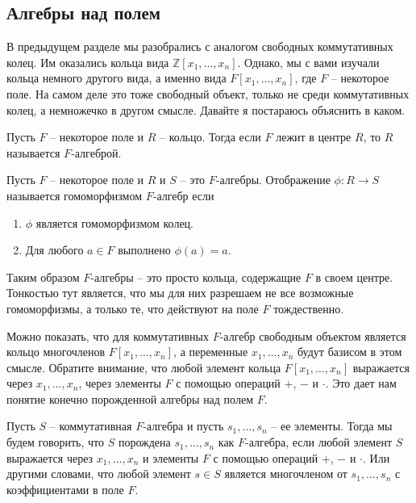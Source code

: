 \subsection{Алгебры над полем}

В предыдущем разделе мы разобрались с аналогом свободных коммутативных колец.
Им оказались кольца вида $\mathbb Z[x_1,\ldots,x_n]$.
Однако, мы с вами изучали кольца немного другого вида, а именно вида $F[x_1,\ldots,x_n]$, где $F$ -- некоторое поле.
На самом деле это тоже свободный объект, только не среди коммутативных колец, а немножечко в другом смысле.
Давайте я постараюсь объяснить в каком.

\begin{definition}
Пусть $F$ -- некоторое поле и $R$ -- кольцо.
Тогда если $F$ лежит в центре $R$, то $R$ называется $F$-алгеброй.
\end{definition}

\begin{definition}
Пусть $F$ -- некоторое поле и $R$ и $S$ -- это $F$-алгебры.
Отображение $\phi\colon R\to S$ называется гомоморфизмом $F$-алгебр если
\begin{enumerate}
\item $\phi$ является гомоморфизмом колец.

\item Для любого $a\in F$ выполнено $\phi(a) = a$.
\end{enumerate}
\end{definition}

Таким образом $F$-алгебры -- это просто кольца, содержащие $F$ в своем центре.
Тонкостью тут является, что мы для них разрешаем не все возможные гомоморфизмы, а только те, что действуют на поле $F$ тождественно.

Можно показать, что для коммутативных $F$-алгебр свободным объектом является кольцо многочленов $F[x_1,\ldots,x_n]$, а переменные $x_1,\ldots,x_n$ будут базисом в этом смысле.
Обратите внимание, что любой элемент кольца $F[x_1,\ldots,x_n]$ выражается через $x_1,\ldots,x_n$, через элементы $F$ с помощью операций $+$, $-$ и $\cdot$.
Это дает нам понятие конечно порожденной алгебры над полем $F$.

\begin{definition}
Пусть $S$ -- коммутативная $F$-алгебра и пусть $s_1,\ldots,s_n$ -- ее элементы.
Тогда мы будем говорить, что $S$ порождена $s_1,\ldots, s_n$ как $F$-алгебра, если любой элемент $S$ выражается через $x_1,\ldots,x_n$ и элементы $F$ с помощью операций $+$, $-$ и $\cdot$.
Или другими словами, что любой элемент $s\in S$ является многочленом от $s_1,\ldots,s_n$ с коэффициентами в поле $F$.
\end{definition}

